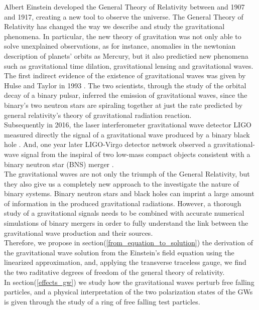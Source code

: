 Albert Einstein developed the General Theory of Relativity between and 1907 and 1917, creating a new tool to observe the universe. 
The General Theory of Relativity has changed the way we describe and study the gravitational phenomena. 
In particular, the new theory of gravitation was not only able to solve unexplained observations, as for instance, anomalies in the newtonian description of planets' orbits as Mercury, but it also predictied new  phenomena such as gravitational time dilation, gravitational lensing and gravitational waves.\\
The first indirect evidence of the existence of gravitational waves was given by Hulse and Taylor in 1993 \cite{weisberg_relativistic_2004,weisberg_timing_2010}. 
The two scientists, through the study of the orbital decay of a binary pulsar, inferred the emission of gravitational waves, since the binary’s two neutron stars are spiraling together at just the rate predicted by general relativity’s theory of gravitational radiation reaction.\\
Subsequently in 2016, the laser interferometer gravitational wave detector LIGO measured directly the signal of a gravitational wave produced by a binary black hole \cite{abbott_observation_2016}.
And, one year later LIGO-Virgo detector network observed a gravitational-wave signal from the inspiral of two low-mass compact objects consistent with a binary neutron star (BNS) merger \cite{abbott_gw170817:_2017}.\\
The gravitational waves are not only the triumph of the General Relativity, but they also give us a completely new approach to the investigate the nature of binary systems. 
Binary neutron stars and black holes can imprint a large amount of information in the produced gravitational radiations.
However, a thorough study of a gravitational signals needs to be combined with accurate numerical simulations of binary mergers in order to fully understand the link between the  gravitational wave production and their sources.\\
Therefore, we propose in  section(\ref{from_equation_to_solution}) the derivation of the gravitational wave solution from the Einstein's field equation using the linearized approximation, and, applying the transverse traceless gauge, we find the two raditative degrees of freedom of the general theory of relativity.\\
In section(\ref{effects_gw}) we study how the gravitational waves perturb free falling particles, and a physical interpretation of the two polarization states of the GWs is given through the study of a ring of free falling test particles.\\
